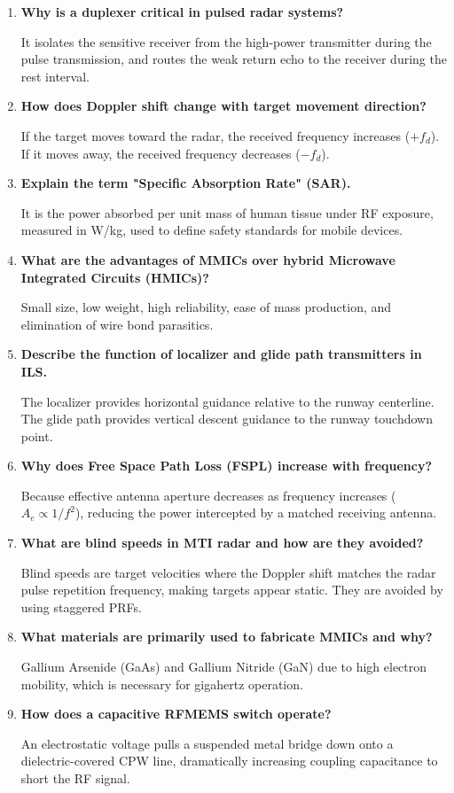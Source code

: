 \documentclass[12pt,a4paper]{article}
\newcommand{\Q}[1]{\textbf{#1}\par\noindent\ignorespaces}
\begin{document}
\begin{tcolorbox}[exambox, title={\textbf{Frequently Asked / Viva Questions}}]
\begin{enumerate}[topsep=0pt, label=\textbf{Q\arabic*.}, itemsep=5pt]
  \item \Q{Why is a duplexer critical in pulsed radar systems?}
    It isolates the sensitive receiver from the high-power transmitter during the pulse transmission, and routes the weak return echo to the receiver during the rest interval.
  \item \Q{How does Doppler shift change with target movement direction?}
    If the target moves toward the radar, the received frequency increases ($+f_d$). If it moves away, the received frequency decreases ($-f_d$).
  \item \Q{Explain the term "Specific Absorption Rate" (SAR).}
    It is the power absorbed per unit mass of human tissue under RF exposure, measured in W/kg, used to define safety standards for mobile devices.
  \item \Q{What are the advantages of MMICs over hybrid Microwave Integrated Circuits (HMICs)?}
    Small size, low weight, high reliability, ease of mass production, and elimination of wire bond parasitics.
  \item \Q{Describe the function of localizer and glide path transmitters in ILS.}
    The localizer provides horizontal guidance relative to the runway centerline. The glide path provides vertical descent guidance to the runway touchdown point.
  \item \Q{Why does Free Space Path Loss (FSPL) increase with frequency?}
    Because effective antenna aperture decreases as frequency increases ($A_e \propto 1/f^2$), reducing the power intercepted by a matched receiving antenna.
  \item \Q{What are blind speeds in MTI radar and how are they avoided?}
    Blind speeds are target velocities where the Doppler shift matches the radar pulse repetition frequency, making targets appear static. They are avoided by using staggered PRFs.
  \item \Q{What materials are primarily used to fabricate MMICs and why?}
    Gallium Arsenide (GaAs) and Gallium Nitride (GaN) due to high electron mobility, which is necessary for gigahertz operation.
  \item \Q{How does a capacitive RFMEMS switch operate?}
    An electrostatic voltage pulls a suspended metal bridge down onto a dielectric-covered CPW line, dramatically increasing coupling capacitance to short the RF signal.

\end{enumerate}
\end{tcolorbox}
\end{document}
